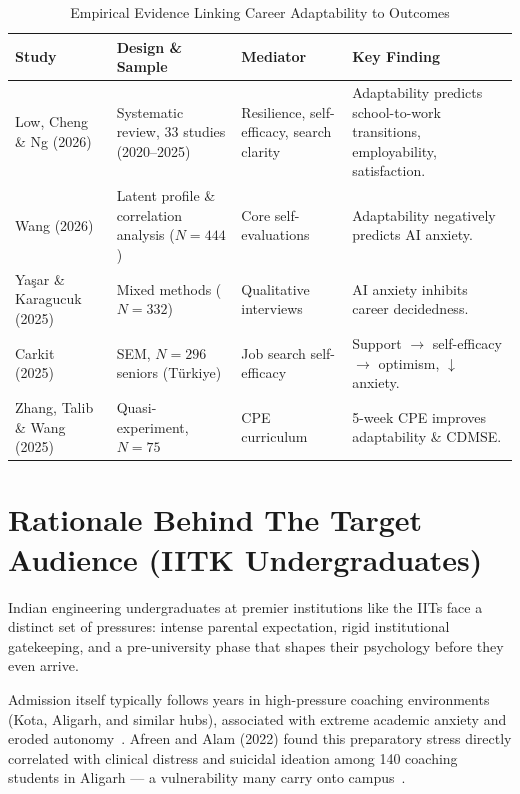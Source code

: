 \begin{table}[htbp]
\centering
\caption{Empirical Evidence Linking Career Adaptability to Outcomes}
\label{tab:career_evidence}
\begin{tabular}{@{}p{3cm}p{3cm}p{2.5cm}p{4.5cm}@{}}
\toprule
\textbf{Study} & \textbf{Design \& Sample} & \textbf{Mediator} & \textbf{Key Finding} \\
\midrule
Low, Cheng \& Ng (2026)~\cite{Low-2026} & Systematic review, 33 studies (2020--2025) & Resilience, self-efficacy, search clarity & Adaptability predicts school-to-work transitions, employability, satisfaction. \\
\addlinespace
Wang (2026)~\cite{Wang-2026-AI} & Latent profile \& correlation analysis ($N=444$) & Core self-evaluations & Adaptability negatively predicts AI anxiety. \\
\addlinespace
Ya\c{s}ar \& Karagucuk (2025)~\cite{Yasar-2025} & Mixed methods ($N=332$) & Qualitative interviews & AI anxiety inhibits career decidedness. \\
\addlinespace
Carkit (2025)~\cite{Carkit-2025} & SEM, $N=296$ seniors (T\"{u}rkiye) & Job search self-efficacy & Support $\rightarrow$ self-efficacy $\rightarrow$ optimism, $\downarrow$ anxiety. \\
\addlinespace
Zhang, Talib \& Wang (2025)~\cite{Zhang-2025} & Quasi-experiment, $N=75$ & CPE curriculum & 5-week CPE improves adaptability \& CDMSE. \\
\bottomrule
\end{tabular}
\end{table}

\section{Rationale Behind The Target Audience (IITK Undergraduates)}

Indian engineering undergraduates at premier institutions like the IITs face a distinct set of pressures: intense parental expectation, rigid institutional gatekeeping, and a pre-university phase that shapes their psychology before they even arrive.

Admission itself typically follows years in high-pressure coaching environments (Kota, Aligarh, and similar hubs), associated with extreme academic anxiety and eroded autonomy~\cite{Maji-2024, Afreen-2022}. Afreen and Alam (2022) found this preparatory stress directly correlated with clinical distress and suicidal ideation among 140 coaching students in Aligarh --- a vulnerability many carry onto campus~\cite{Afreen-2022}.

